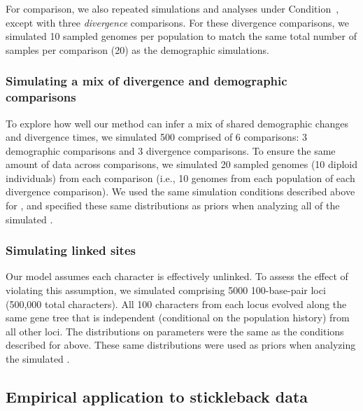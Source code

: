 For comparison, we also repeated simulations and analyses under
Condition~\vsimfourinc, except with three \emph{divergence} comparisons.
For these divergence comparisons, we simulated 10 sampled genomes per
population to match the same total number of samples per comparison (20) as the
demographic simulations.


\subsubsection{Simulating a mix of divergence and demographic comparisons}

To explore how well our method can infer a mix of shared demographic changes
and divergence times, we simulated 500 \datasets comprised of 6 comparisons:
3 demographic comparisons and
3 divergence comparisons.
To ensure the same amount of data across comparisons, we simulated
20 sampled genomes (10 diploid individuals) from each comparison
(i.e., 10 genomes from each population of each divergence comparison).
We used the same simulation conditions described above for
\vsimtwoinc,
and specified these same distributions as priors when analyzing all of the
simulated \datasets.


\subsubsection{Simulating linked sites}
Our model assumes each character is effectively unlinked.
To assess the effect of violating this assumption, we simulated \datasets
comprising 5000 100-base-pair loci (500,000 total characters).
All 100 characters from each locus evolved along the same gene tree that is
independent (conditional on the population history) from all other loci.
The distributions on parameters were the same
as the conditions described for \vsimfourinc above.
These same distributions were used as priors when analyzing the simulated
\datasets.



\subsection{Empirical application to stickleback data}


